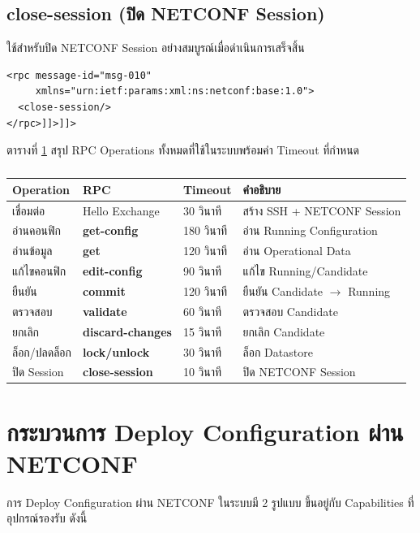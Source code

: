 \subsection{close-session (ปิด NETCONF Session)}
\hspace*{1.3em}
ใช้สำหรับปิด NETCONF Session อย่างสมบูรณ์เมื่อดำเนินการเสร็จสิ้น

\begin{verbatim}
<rpc message-id="msg-010"
     xmlns="urn:ietf:params:xml:ns:netconf:base:1.0">
  <close-session/>
</rpc>]]>]]>
\end{verbatim}

\hspace*{1.3em}
ตารางที่ \ref{tabD:RpcOperations} สรุป RPC Operations ทั้งหมดที่ใช้ในระบบพร้อมค่า Timeout ที่กำหนด

\begin{table}[H]
\centering
\caption{}
\label{tabD:RpcOperations}
\begin{tabularx}{\textwidth}{|l|l|l|X|}
\hline
\textbf{Operation} & \textbf{RPC} & \textbf{Timeout} & \textbf{คำอธิบาย} \\
\hline
เชื่อมต่อ & Hello Exchange & 30 วินาที & สร้าง SSH + NETCONF Session \\
\hline
อ่านคอนฟิก & \textbf{get-config} & 180 วินาที & อ่าน Running Configuration \\
\hline
อ่านข้อมูล & \textbf{get} & 120 วินาที & อ่าน Operational Data \\
\hline
แก้ไขคอนฟิก & \textbf{edit-config} & 90 วินาที & แก้ไข Running/Candidate \\
\hline
ยืนยัน & \textbf{commit} & 120 วินาที & ยืนยัน Candidate $\rightarrow$ Running \\
\hline
ตรวจสอบ & \textbf{validate} & 60 วินาที & ตรวจสอบ Candidate \\
\hline
ยกเลิก & \textbf{discard-changes} & 15 วินาที & ยกเลิก Candidate \\
\hline
ล็อก/ปลดล็อก & \textbf{lock/unlock} & 30 วินาที & ล็อก Datastore \\
\hline
ปิด Session & \textbf{close-session} & 10 วินาที & ปิด NETCONF Session \\
\hline
\end{tabularx}
\end{table}

\section{กระบวนการ Deploy Configuration ผ่าน NETCONF}
\hspace*{1.3em}
การ Deploy Configuration ผ่าน NETCONF ในระบบมี 2 รูปแบบ ขึ้นอยู่กับ Capabilities ที่อุปกรณ์รองรับ ดังนี้

